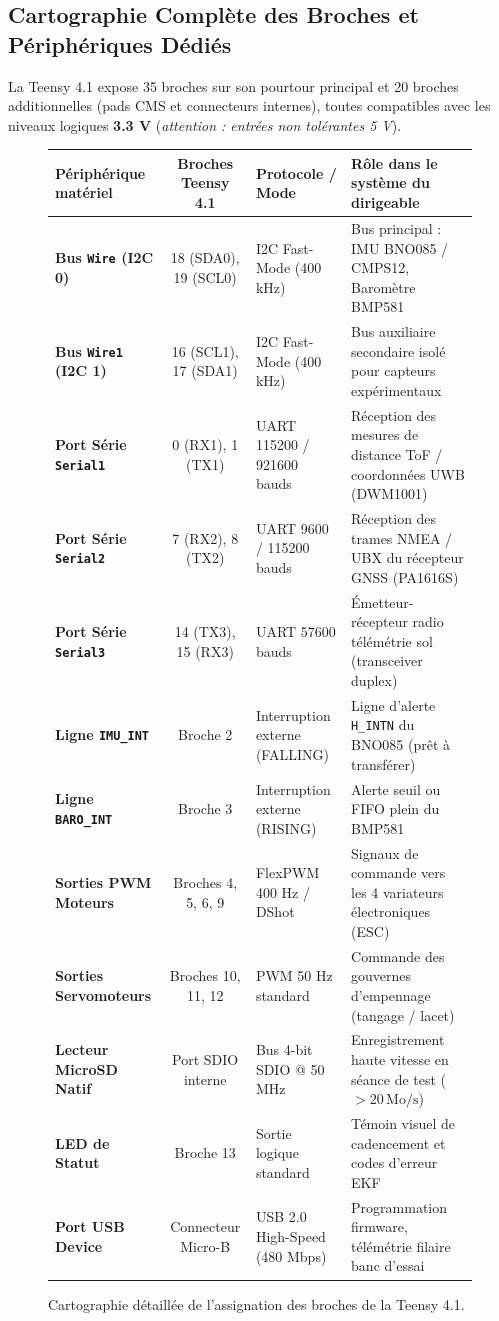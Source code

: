\documentclass[../Materiel.tex]{subfiles}
\begin{document}
\subsection{Cartographie Complète des Broches et Périphériques Dédiés}

La Teensy 4.1 expose 35 broches sur son pourtour principal et 20 broches additionnelles (pads CMS et connecteurs internes), toutes compatibles avec les niveaux logiques \textbf{3.3 V} (\textit{attention : entrées non tolérantes 5 V}).

\begin{figure}[htbp]
\centering
\small
\begin{tabular}{|l|c|l|p{6cm}|}
\hline
\textbf{Périphérique matériel} & \textbf{Broches Teensy 4.1} & \textbf{Protocole / Mode} & \textbf{Rôle dans le système du dirigeable} \\
\hline
\textbf{Bus \texttt{Wire} (I2C 0)} & 18 (SDA0), 19 (SCL0) & I2C Fast-Mode (400 kHz) & Bus principal : IMU BNO085 / CMPS12, Baromètre BMP581 \\
\textbf{Bus \texttt{Wire1} (I2C 1)} & 16 (SCL1), 17 (SDA1) & I2C Fast-Mode (400 kHz) & Bus auxiliaire secondaire isolé pour capteurs expérimentaux \\
\textbf{Port Série \texttt{Serial1}} & 0 (RX1), 1 (TX1) & UART 115200 / 921600 bauds & Réception des mesures de distance ToF / coordonnées UWB (DWM1001) \\
\textbf{Port Série \texttt{Serial2}} & 7 (RX2), 8 (TX2) & UART 9600 / 115200 bauds & Réception des trames NMEA / UBX du récepteur GNSS (PA1616S) \\
\textbf{Port Série \texttt{Serial3}} & 14 (TX3), 15 (RX3) & UART 57600 bauds & Émetteur-récepteur radio télémétrie sol (transceiver duplex) \\
\textbf{Ligne \texttt{IMU\_INT}} & Broche 2 & Interruption externe (FALLING) & Ligne d'alerte \texttt{H\_INTN} du BNO085 (prêt à transférer) \\
\textbf{Ligne \texttt{BARO\_INT}} & Broche 3 & Interruption externe (RISING) & Alerte seuil ou FIFO plein du BMP581 \\
\textbf{Sorties PWM Moteurs} & Broches 4, 5, 6, 9 & FlexPWM 400 Hz / DShot & Signaux de commande vers les 4 variateurs électroniques (ESC) \\
\textbf{Sorties Servomoteurs} & Broches 10, 11, 12 & PWM 50 Hz standard & Commande des gouvernes d'empennage (tangage / lacet) \\
\textbf{Lecteur MicroSD Natif} & Port SDIO interne & Bus 4-bit SDIO @ 50 MHz & Enregistrement haute vitesse en séance de test ($> 20\,\text{Mo/s}$) \\
\textbf{LED de Statut} & Broche 13 & Sortie logique standard & Témoin visuel de cadencement et codes d'erreur EKF \\
\textbf{Port USB Device} & Connecteur Micro-B & USB 2.0 High-Speed (480 Mbps) & Programmation firmware, télémétrie filaire banc d'essai \\
\hline
\end{tabular}
\caption{Cartographie détaillée de l'assignation des broches de la Teensy 4.1.}
\label{tab:teensy41_pinout}
\end{figure}
\end{document}
